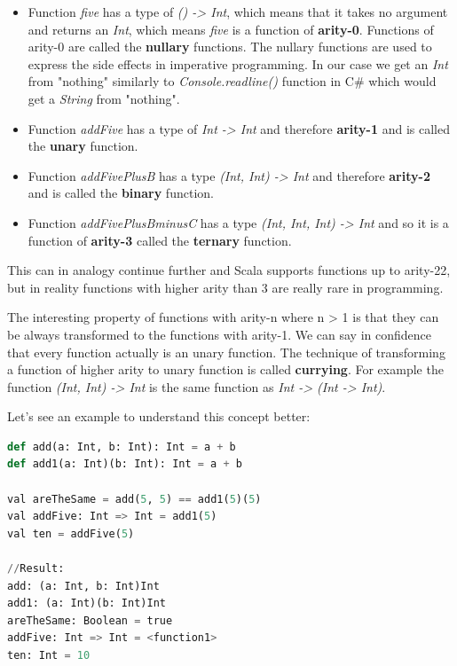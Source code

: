 \documentclass[12pt,twoside,a4paper]{report}
\begin{document}
\begin{itemize}\itemsep1pt \parskip0pt 
\item Function \emph{five} has a type of \emph{() -> Int}, which means that it takes no argument and returns an \emph{Int}, which means \emph{five} is a function of \textbf{arity-0}. Functions of arity-0 are called the \textbf{nullary} functions. The nullary functions are used to express the side effects in imperative programming. In our case we get an \emph{Int} from "nothing" similarly to \emph{Console.readline()} function in C\# which would get a \emph{String} from "nothing".
\item Function \emph{addFive} has a type of \emph{Int -> Int} and therefore \textbf{arity-1} and is called the \textbf{unary} function.
\item Function \emph{addFivePlusB} has a type \emph{(Int, Int) -> Int} and therefore \textbf{arity-2} and is called the \textbf{binary} function.
\item Function \emph{addFivePlusBminusC} has a type \emph{(Int, Int, Int) -> Int} and so it is a function of \textbf{arity-3} called the \textbf{ternary} function.
\end{itemize}

This can in analogy continue further and Scala supports functions up to arity-22, but in reality functions with higher arity than 3 are really rare in programming.

The interesting property of functions with arity-n where n > 1 is that they can be always transformed to the functions with arity-1. We can say in confidence that every function actually is an unary function. The technique of transforming a function of higher arity to unary function is called \textbf{currying}. For example the function \emph{(Int, Int) -> Int} is the same function as \emph{Int -> (Int -> Int)}.

Let's see an example to understand this concept better:

\begin{lstlisting}[language=python]
def add(a: Int, b: Int): Int = a + b
def add1(a: Int)(b: Int): Int = a + b
  
val areTheSame = add(5, 5) == add1(5)(5)
val addFive: Int => Int = add1(5)
val ten = addFive(5)

//Result:
add: (a: Int, b: Int)Int
add1: (a: Int)(b: Int)Int
areTheSame: Boolean = true
addFive: Int => Int = <function1>
ten: Int = 10
\end{lstlisting}
\end{document}
